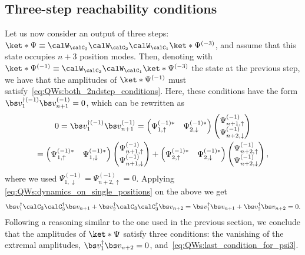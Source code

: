 \subsection{Three-step reachability conditions}
\label{sec:QWs:3step_reachability}
Let us now consider an output of three steps:
$\ket*{\Psi} \equiv \calW_{\calC_3}\calW_{\calC_2}\calW_{\calC_1} \ket*{\Psi^{(-3)}}$,
and assume that this state occupies $n+3$ position modes.
Then, denoting with
$\ket*{\Psi^{(-1)}} \equiv \calW_{\calC_2}\calW_{\calC_1} \ket*{\Psi^{(-3)}}$
the state at the previous step, we have that the amplitudes of $\ket*{\Psi^{(-1)}}$ must satisfy~\cref{eq:QWs:both_2ndstep_conditions}.
Here, these conditions have the form
$\bs v_1^{\dagger(-1)} \bs v_{n+1}^{(-1)}=0$,
which can be rewritten as
\begin{equation}
\begin{gathered}
	0 = \bs v_1^{\dagger(-1)} \bs v_{n+1}^{(-1)} = 
	\begin{pmatrix} \Psi^{(-1)*}_{1,\uparrow} & \Psi^{(-1)*}_{2,\downarrow} \end{pmatrix}
	\begin{pmatrix} \Psi^{(-1)}_{n+1,\uparrow} \\ \Psi^{(-1)}_{n+2,\downarrow} \end{pmatrix}
	\\
	=
	\begin{pmatrix} \Psi^{(-1)*}_{1,\uparrow} & \Psi^{(-1)*}_{1,\downarrow} \end{pmatrix}
	\begin{pmatrix} \Psi^{(-1)}_{n+1,\uparrow} \\ \Psi^{(-1)}_{n+1,\downarrow} \end{pmatrix} +
	\begin{pmatrix} \Psi^{(-1)*}_{2,\uparrow} & \Psi^{(-1)*}_{2,\downarrow} \end{pmatrix}
	\begin{pmatrix} \Psi^{(-1)}_{n+2,\uparrow} \\ \Psi^{(-1)}_{n+2,\downarrow} \end{pmatrix},
\end{gathered}
\end{equation}
where we used
$\Psi^{(-1)}_{1,\downarrow} = \Psi^{(-1)}_{n+2,\uparrow} = 0$.
Applying \cref{eq:QWs:dynamics_on_single_positions} on the above we get
\begin{equation}
\begin{aligned}
    \bs v_1^{\dagger} \calC_3 \calC_3^\dagger \bs v_{n+1}+
    \bs v_2^{\dagger} \calC_3 \calC_3^\dagger \bs v_{n+2}  =
    \bs v_1^{\dagger} \bs v_{n+1} +
    \bs v_2^{\dagger} \bs v_{n+2} = 0.
\end{aligned}
\label{eq:QWs:last_condition_for_psi3}
\end{equation}
Following a reasoning similar to the one used in the previous section, we conclude that the amplitudes of $\ket*{\Psi}$ satisfy three conditions:
the vanishing of the extremal amplitudes, $\bs v_1^{\dagger} \bs v_{n+2} = 0$, and~\cref{eq:QWs:last_condition_for_psi3}.

